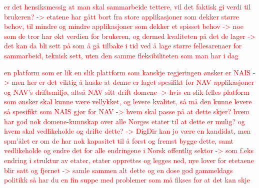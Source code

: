 


\textcolor{red}{er det hensiksmessig at man skal sammarbeide tettere, vil det faktisk gi verdi til brukeren? -> etatene har gått bort fra store applikasjoner som dekker større behov, til mindre og mindre applikasjoner som dekker et spisset behov -> noe som de tror har økt verdien for brukeren, og dermed kvaliteten på det de lager -> det kan da bli sett på som å gå tilbake i tid ved å lage større fellesarenaer for sammarbeid, teknisk sett, uten den samme fleksibiliteten som man har i dag}

\textcolor{red}{en platform som er lik en slik plattform som kanskje regjeringen ønsker er NAIS -> men her er det viktig å huske at denne er laget spesifikt for NAV applikasjoner og NAV's driftsmiljø, altså NAV sitt drift domene -> hvis en slik felles platform som ønsker skal kunne være vellykket, og levere kvalitet, så må den kunne levere så spesifikt som NAIS gjør for NAV -> hvem skal passe på at dette skjer? hvem har god nok domene-kunnskap over alle Norges etater til at dette er mulig? og hvem skal vedlikeholde og drifte dette? -> DigDir kan jo være en kandidat, men spm'ålet er om de har nok kapasitet til å først og fremst bygge dette, samt vedlikeholde og endre det for alle endringene i Norsk offentlig sektor -> som f.eks endring i struktur av etater, etater opprettes og legges ned, nye lover for etetaene blir satt og fjernet -> samle sammen alt dette og en dose god gammeldags politikk så har du en fin suppe med problemer som må fikses for at det kan skje}

